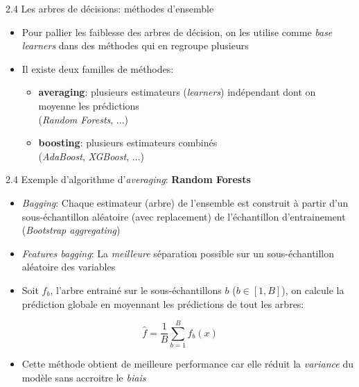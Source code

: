 \begin{frame}{2.4 Les arbres de décisions: méthodes d'ensemble}
  \begin{itemize}
  \item Pour pallier les faiblesse des arbres de décision, on les utilise comme \textit{base learners} dans des méthodes qui en regroupe plusieurs
  \item Il existe deux familles de méthodes:
    \begin{itemize}
      \normalsize
      \vspace{0.5cm}
    \item \textbf{averaging}: plusieurs estimateurs (\textit{learners}) indépendant dont on moyenne les prédictions \\ (\textit{Random Forests}, $\dots$)
      \vspace{0.5cm}
    \item \textbf{boosting}: plusieurs estimateurs combinés \\(\textit{AdaBoost}, \textit{XGBoost}, $\dots$)
    \end{itemize}
  \end{itemize}
\end{frame}

\begin{frame}{2.4 Exemple d'algorithme d'\textit{averaging}: \textbf{Random Forests}}
  \begin{itemize}
  \item \textit{Bagging}: Chaque estimateur (arbre) de l'ensemble est construit à partir d'un sous-échantillon aléatoire (avec replacement) de l'échantillon d'entrainement (\textit{Bootstrap aggregating})
  \item \textit{Features bagging}: La \textit{meilleure} séparation possible sur un sous-échantillon aléatoire des variables
  \item Soit $f_{b}$, l'arbre entrainé sur le sous-échantillons $b$ ($b \in[1,B]$), on calcule la prédiction globale en moyennant les prédictions de tout les arbres:
  \end{itemize}
  \begin{equation*}
    \hat{f} = \frac{1}{B}\displaystyle\sum_{b=1}^{B} f_{b}(x)
  \end{equation*}
  \begin{itemize}
  \item Cette méthode obtient de meilleure performance car elle réduit la \textit{variance} du modèle sans accroitre le \textit{biais}
  \end{itemize}
\end{frame}

